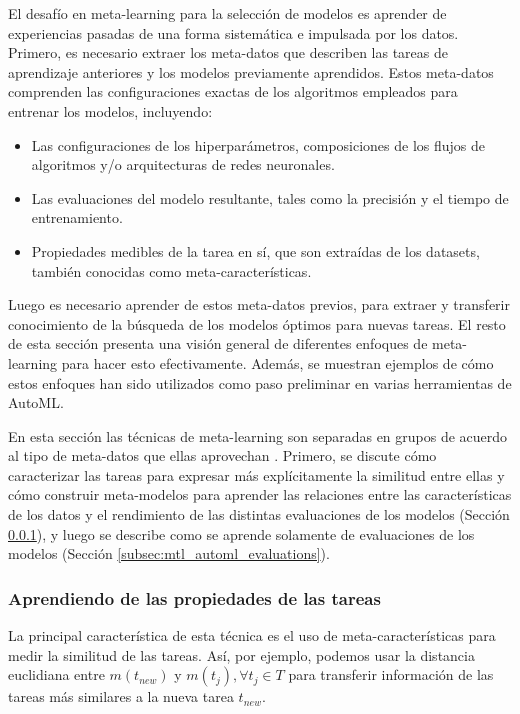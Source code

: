 \documentclass[a4paper,10pt,twocolumn]{article}
\begin{document}
El desafío en meta-learning para la selección de modelos es aprender de experiencias pasadas de una forma sistemática e impulsada por los datos. Primero, es necesario extraer los meta-datos que describen las tareas de aprendizaje anteriores y los modelos previamente aprendidos. Estos meta-datos comprenden las configuraciones exactas de los algoritmos empleados para entrenar los modelos, incluyendo:

\begin{itemize}
	\item Las configuraciones de los hiperparámetros, composiciones de los flujos de algoritmos y/o arquitecturas de redes neuronales.
	\item Las evaluaciones del modelo resultante, tales como la precisión y el tiempo de entrenamiento.
	\item Propiedades medibles de la tarea en sí, que son extraídas de los datasets, también conocidas como meta-características.
\end{itemize}

Luego es necesario aprender de estos meta-datos previos, para extraer y transferir conocimiento de la búsqueda de los modelos óptimos para nuevas tareas. El resto de esta sección presenta una visión general de diferentes enfoques de meta-learning para hacer esto efectivamente. Además, se muestran ejemplos de cómo estos enfoques han sido utilizados como paso preliminar en varias herramientas de AutoML.

En esta sección las técnicas de meta-learning son separadas en grupos de acuerdo al tipo de meta-datos que ellas aprovechan \cite{vanschoren2018metalearning}. Primero, se discute cómo caracterizar las tareas para expresar más explícitamente la similitud entre ellas y cómo construir meta-modelos para aprender las relaciones entre las características de los datos y el rendimiento de las distintas evaluaciones de los modelos (Sección \ref{subsec:mtl_automl_proprerties}), y luego se describe como se aprende solamente de evaluaciones de los modelos (Sección \ref{subsec:mtl_automl_evaluations}).

\subsubsection{Aprendiendo de las propiedades de las tareas}\label{subsec:mtl_automl_proprerties}
La principal característica de esta técnica es el uso de meta-características para medir la similitud de las tareas. Así, por ejemplo, podemos usar la distancia euclidiana entre $m(t_{new})$ y $m(t_j), \forall t_j \in T$ para transferir información de las tareas más similares a la nueva tarea $t_{new}$.
\end{document}

